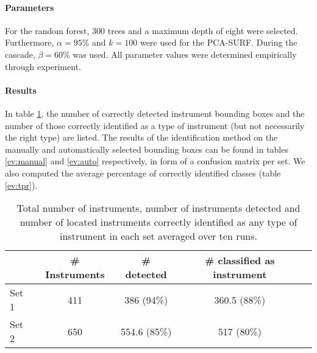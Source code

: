 \documentclass{llncs}
\begin{document}
\paragraph{Parameters}
For the random forest, 300 trees and a maximum depth of eight were selected.
Furthermore, $\alpha = 95\%$ and $k = 100$ were used for the PCA-SURF.
During the cascade, $\beta = 60\%$ was used.
All parameter values were determined empirically through experiment. 
\paragraph{Results}

In table \ref{ev:dect}, the number of correctly detected instrument bounding boxes and the number of those correctly identified as a type of instrument (but not necessarily the right type) are listed.
The results of the identification method on the manually and automatically selected bounding boxes can be found in tables \ref{ev:manual} and \ref{ev:auto} respectively, in form of a confusion matrix per set.
We also computed the average percentage of correctly identified classes (table \ref{ev:tpr}).
\begin{table}[tb]
\caption{Total number of instruments, number of instruments detected and number of located instruments correctly identified as any type of instrument in each set averaged over ten runs.}
\centering
 \begin{tabular}{l||c|c|c|c}
&\# Instruments&\# detected&\# classified as instrument\\
 \hline
 \hline
Set 1&411&386 (94\%)&360.5 (88\%)\\
Set 2&650&554.6 (85\%)&517 (80\%)\\
 \hline
 \hline 
 \end{tabular}
  \label{ev:dect}
 \end{table}
 
\end{document}
